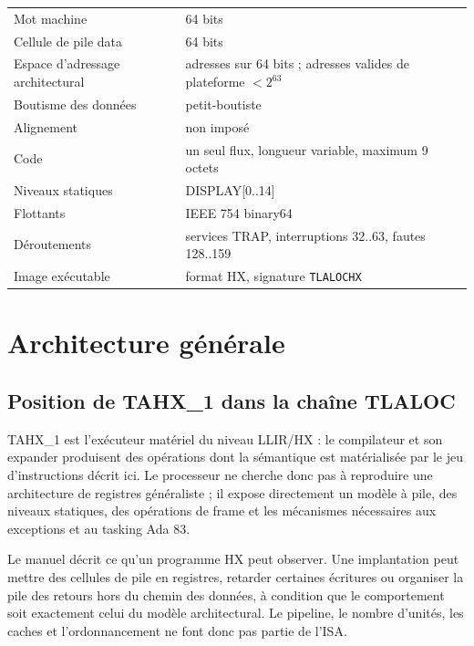 \documentclass[10pt,a4paper,twoside,openany]{book}
\newcommand{\reg}[1]{\textsc{#1}}
\begin{document}
\begin{architecturebox}
\begin{tabularx}{\linewidth}{@{}lX@{}}
Mot machine & 64 bits \\
Cellule de pile data & 64 bits \\
Espace d'adressage architectural & adresses sur 64 bits ; adresses valides de plateforme $<2^{63}$ \\
Boutisme des données & petit-boutiste \\
Alignement & non imposé \\
Code & un seul flux, longueur variable, maximum 9 octets \\
Niveaux statiques & \reg{DISPLAY[0..14]} \\
Flottants & IEEE 754 binary64 \\
Déroutements & services TRAP, interruptions 32..63, fautes 128..159 \\
Image exécutable & format HX, signature \texttt{TLALOCHX} \\
\end{tabularx}
\end{architecturebox}

\tableofcontents
\clearpage
\clearpage
{}

\chapter{Architecture générale}
\section{Position de TAHX\_1 dans la chaîne TLALOC}
TAHX\_1 est l'exécuteur matériel du niveau LLIR/HX : le compilateur et son expander produisent des opérations dont la sémantique est matérialisée par le jeu d'instructions décrit ici. Le processeur ne cherche donc pas à reproduire une architecture de registres généraliste ; il expose directement un modèle à pile, des niveaux statiques, des opérations de frame et les mécanismes nécessaires aux exceptions et au tasking Ada 83.

\begin{designbox}
Le manuel décrit ce qu'un programme HX peut observer. Une implantation peut mettre des cellules de pile en registres, retarder certaines écritures ou organiser la pile des retours hors du chemin des données, à condition que le comportement soit exactement celui du modèle architectural. Le pipeline, le nombre d'unités, les caches et l'ordonnancement ne font donc pas partie de l'ISA.
\end{designbox}
\end{document}
